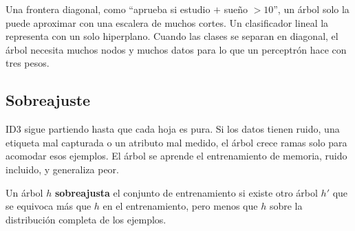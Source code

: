 \documentclass[11pt,letterpaper]{article}
\begin{document}
\begin{ojo}
    Una frontera diagonal, como ``aprueba si estudio $+$ sueño
    $> 10$'', un árbol solo la puede aproximar con una escalera de
    muchos cortes. Un clasificador lineal la representa con un solo
    hiperplano. Cuando las clases se separan en diagonal, el árbol
    necesita muchos nodos y muchos datos para lo que un perceptrón
    hace con tres pesos.
\end{ojo}


\subsection*{Sobreajuste}

ID3 sigue partiendo hasta que cada hoja es pura. Si los datos tienen
ruido, una etiqueta mal capturada o un atributo mal medido, el árbol
crece ramas solo para acomodar esos ejemplos. El árbol se aprende el
entrenamiento de memoria, ruido incluido, y generaliza peor.

\begin{definicion}[Sobreajuste]
    Un árbol $h$ \textbf{sobreajusta} el conjunto de entrenamiento si
    existe otro árbol $h'$ que se equivoca más que $h$ en el
    entrenamiento, pero menos que $h$ sobre la distribución completa
    de los ejemplos.
\end{definicion}
\end{document}
